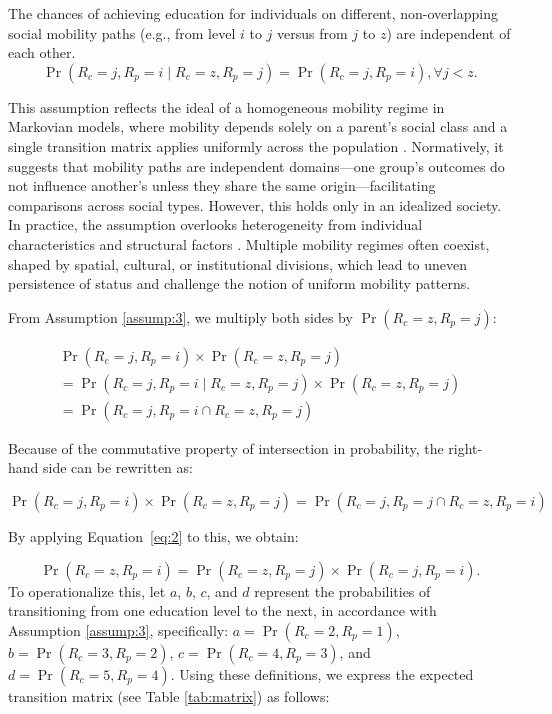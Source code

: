 \begin{assumption} \label{assump:3}
The chances of achieving education for individuals on different, non-overlapping social mobility paths (e.g., from level \( i \) to \( j \) versus from \( j \) to \( z \)) are independent of each other.
\[
\operatorname{Pr}(R_c = j, R_p = i \mid R_c = z, R_p = j) = \operatorname{Pr}(R_c = j, R_p = i), \forall j < z.
\]
\end{assumption}
This assumption reflects the ideal of a homogeneous mobility regime in Markovian models, where mobility depends solely on a parent's social class and a single transition matrix applies uniformly across the population \citep{pullum_occupational_1981}. Normatively, it suggests that mobility paths are independent domains---one group's outcomes do not influence another's unless they share the same origin---facilitating comparisons across social types. However, this holds only in an idealized society. In practice, the assumption overlooks heterogeneity from individual characteristics and structural factors \citep{song2021multigenerational}. Multiple mobility regimes often coexist, shaped by spatial, cultural, or institutional divisions, which lead to uneven persistence of status and challenge the notion of uniform mobility patterns.

From Assumption \ref{assump:3}, we multiply both sides by \( \operatorname{Pr}(R_c = z, R_p = j) \):

\[
\begin{array}{l}
\operatorname{Pr}(R_c = j, R_p = i) \times \operatorname{Pr}(R_c = z, R_p = j) \\
= \operatorname{Pr}(R_c = j, R_p = i \mid R_c = z, R_p = j) \times \operatorname{Pr}(R_c = z, R_p = j) \\
= \operatorname{Pr}(R_c = j, R_p = i \cap R_c = z, R_p = j)
\end{array}
\]

Because of the commutative property of intersection in probability, the right-hand side can be rewritten as:

\[
\operatorname{Pr}(R_c = j, R_p = i) \times \operatorname{Pr}(R_c = z, R_p = j) = \operatorname{Pr}(R_c = j, R_p = j \cap R_c = z, R_p = i)
\]

By applying Equation~\eqref{eq:2} to this, we obtain:

\[
\operatorname{Pr}(R_c = z, R_p = i) = \operatorname{Pr}(R_c = z, R_p = j) \times \operatorname{Pr}(R_c = j, R_p = i).
\]
To operationalize this, let \( a \), \( b \), \( c \), and \( d \) represent the probabilities of transitioning from one education level to the next, in accordance with Assumption \ref{assump:3}, specifically: \( a = \operatorname{Pr}(R_c = 2, R_p = 1) \), \( b = \operatorname{Pr}(R_c = 3, R_p = 2) \), \( c = \operatorname{Pr}(R_c = 4, R_p = 3) \), and \( d = \operatorname{Pr}(R_c = 5, R_p = 4) \). Using these definitions, we express the expected transition matrix (see Table \ref{tab:matrix}) as follows:

